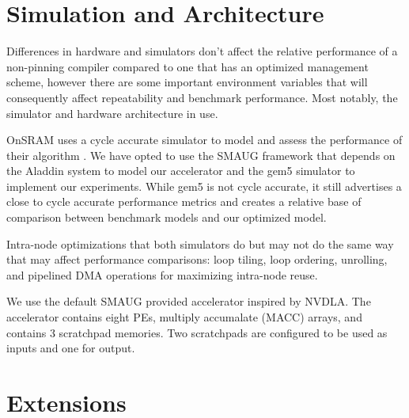 
\section{Simulation and Architecture}

Differences in hardware and simulators don't affect the relative performance of
a non-pinning compiler compared to one that has an optimized management scheme,
however there are some important environment variables that will consequently
affect repeatability and benchmark performance. Most notably, the simulator and
hardware architecture in use.

OnSRAM uses a cycle accurate simulator to model and assess the performance of
their algorithm \cite{onsram}.  We have opted to use the SMAUG\cite{smaug}
framework that depends on the Aladdin\cite{aladdin} system to model our
accelerator and the gem5 simulator\cite{gem5} to implement our experiments.
While gem5 is not cycle accurate, it still advertises a close to cycle accurate
performance metrics and creates a relative base of comparison between benchmark
models and our optimized model.

Intra-node optimizations that both simulators do but may not do the same way
that may affect performance comparisons: loop tiling, loop ordering, unrolling,
and pipelined DMA operations for maximizing intra-node reuse.

We use the default SMAUG provided accelerator inspired by NVDLA\cite{smaug}.
The accelerator contains eight PEs, multiply accumalate (MACC) arrays, and
contains 3 scratchpad memories\cite{smaug}. Two scratchpads are configured to
be used as inputs and one for output.



\section{Extensions}

